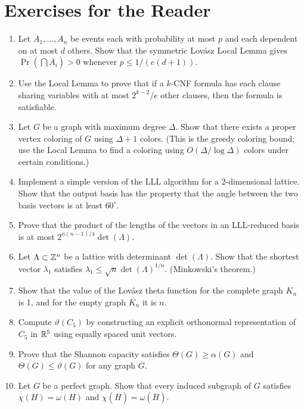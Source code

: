 \section*{Exercises for the Reader}

\begin{enumerate}
  \item [B] Let \(A_1, \dots, A_n\) be events each with probability at most \(p\) and each dependent on at most \(d\) others. Show that the symmetric Lov\'{a}sz Local Lemma gives \(\Pr(\bigcap \overline{A_i}) > 0\) whenever \(p \leq 1/(e(d+1))\).
  \item [I] Use the Local Lemma to prove that if a \(k\)-CNF formula has each clause sharing variables with at most \(2^{k-2}/e\) other clauses, then the formula is satisfiable.
  \item [I] Let \(G\) be a graph with maximum degree \(\Delta\). Show that there exists a proper vertex coloring of \(G\) using \(\Delta + 1\) colors. (This is the greedy coloring bound; use the Local Lemma to find a coloring using \(O(\Delta / \log \Delta)\) colors under certain conditions.)
  \item [B] Implement a simple version of the LLL algorithm for a 2-dimensional lattice. Show that the output basis has the property that the angle between the two basis vectors is at least \(60^\circ\).
  \item [I] Prove that the product of the lengths of the vectors in an LLL-reduced basis is at most \(2^{n(n-1)/4} \det(\Lambda)\).
  \item [B] Let \(\Lambda \subset \mathbb{Z}^n\) be a lattice with determinant \(\det(\Lambda)\). Show that the shortest vector \(\lambda_1\) satisfies \(\lambda_1 \leq \sqrt{n} \det(\Lambda)^{1/n}\). (Minkowski's theorem.)
  \item [B] Show that the value of the Lov\'{a}sz theta function for the complete graph \(K_n\) is 1, and for the empty graph \(\overline{K_n}\) it is \(n\).
  \item [I] Compute \(\vartheta(C_5)\) by constructing an explicit orthonormal representation of \(C_5\) in \(\mathbb{R}^5\) using equally spaced unit vectors.
  \item [I] Prove that the Shannon capacity satisfies \(\Theta(G) \geq \alpha(G)\) and \(\Theta(G) \leq \vartheta(G)\) for any graph \(G\).
  \item [I] Let \(G\) be a perfect graph. Show that every induced subgraph of \(G\) satisfies \(\chi(H) = \omega(H)\) and \(\chi(\overline{H}) = \omega(\overline{H})\).

\end{enumerate}
